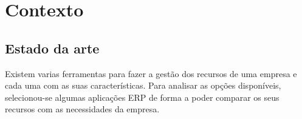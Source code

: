 \chapter{Contexto} 
\label{cap:2}

\section{Estado da arte}
Existem varias ferramentas para fazer a gestão dos recursos de uma empresa e cada uma com as suas características. Para analisar as opções disponíveis, selecionou-se algumas aplicações ERP de forma a poder comparar os seus recursos com as necessidades da empresa.

